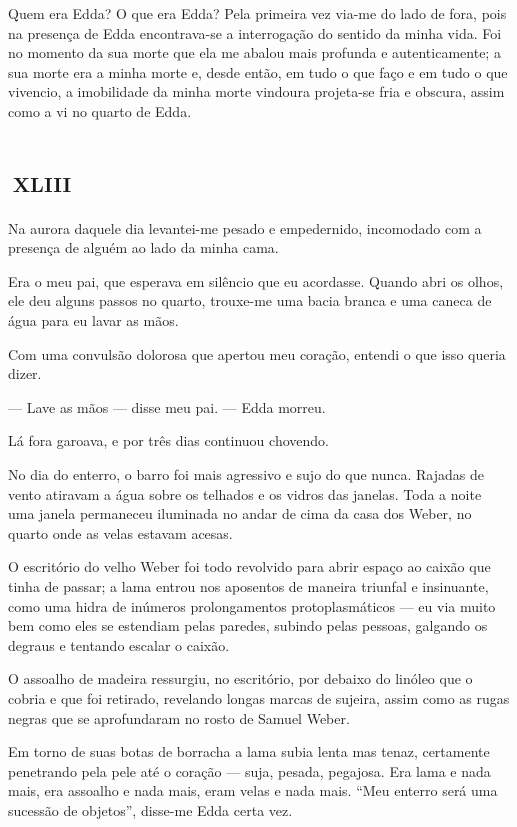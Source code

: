 Quem era Edda? O que era Edda? Pela primeira vez via-me do lado de fora, pois na presença de Edda encontrava-se a interrogação do sentido da minha vida. Foi no momento da sua morte que ela me abalou mais profunda e autenticamente; a sua morte era a minha morte e, desde então, em tudo o que faço e em tudo o que vivencio, a imobilidade da minha morte vindoura projeta-se fria e obscura, assim como a vi no quarto de Edda.


\chapter*{\small{}\,\Large\centering\textsc{xliii}\,\small{}}

Na aurora daquele dia levantei-me pesado e empedernido, incomodado com a presença de alguém ao lado da minha cama.

Era o meu pai, que esperava em silêncio que eu acordasse. Quando abri os olhos, ele deu alguns passos no quarto, trouxe-me uma bacia branca e uma caneca de água para eu lavar as mãos.

Com uma convulsão dolorosa que apertou meu coração, entendi o que isso queria dizer.

--- Lave as mãos --- disse meu pai. --- Edda morreu.

Lá fora garoava, e por três dias continuou chovendo.

No dia do enterro, o barro foi mais agressivo e sujo do que nunca. Rajadas de vento atiravam a água sobre os telhados e os vidros das janelas. Toda a noite uma janela permaneceu iluminada no andar de cima da casa dos Weber, no quarto onde as velas estavam acesas.

O escritório do velho Weber foi todo revolvido para abrir espaço ao caixão que tinha de passar; a lama entrou nos aposentos de maneira triunfal e insinuante, como uma hidra de inúmeros prolongamentos protoplasmáticos --- eu via muito bem como eles se estendiam pelas paredes, subindo pelas pessoas, galgando os degraus e tentando escalar o caixão.

O assoalho de madeira ressurgiu, no escritório, por debaixo do linóleo que o cobria e que foi retirado, revelando longas marcas de sujeira, assim como as rugas negras que se aprofundaram no rosto de Samuel Weber.

Em torno de suas botas de borracha a lama subia lenta mas tenaz, certamente penetrando pela pele até o coração --- suja, pesada, pegajosa. Era lama e nada mais, era assoalho e nada mais, eram velas e nada mais. ``Meu enterro será uma sucessão de objetos'', disse-me Edda certa vez.


